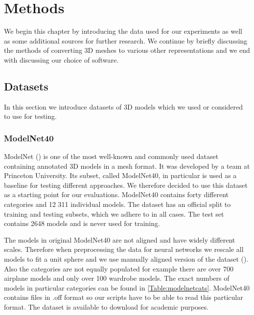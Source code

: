 \chapter{Methods}
\label{sec:chap4}
We begin this chapter by introducing the data used for our experiments as well as some additional sources for further research. We continue by briefly discussing the methods of converting 3D meshes to various other representations and we end with discussing our choice of software.

\section{Datasets}
\label{sec:dataset}
In this section we introduce datasets of 3D models which we used or considered to use for testing.

\subsection{ModelNet40}
ModelNet (\cite{wu_3d_2014}) is one of the most well-known and commonly used dataset containing annotated 3D models in a mesh format. It was developed by a team at Princeton University. Its subset, called ModelNet40, in particular is used as a baseline for testing different approaches. We therefore decided to use this dataset as a starting point for our evaluations. ModelNet40 contains forty different categories and 12 311 individual models. The dataset has an official split to training and testing subsets, which we adhere to in all cases. The test set contains 2648 models and is never used for training. \par



The models in original ModelNet40 are not aligned and have widely different scales. Therefore when preprocessing the data for neural networks we rescale all models to fit a  unit sphere and we use manually aligned version of the dataset (\cite{sedaghat_orientation-boosted_2016}). Also the categories are not equally populated for example there are over 700 airplane models and only over 100 wardrobe models. The exact numbers of models in particular categories can be found in \autoref{Table:modelnetcats}. ModelNet40 contains files in .off format so our scripts have to be able to read this particular format. The dataset is available to download for academic purposes.




